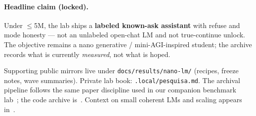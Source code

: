 \paragraph{Headline claim (locked).}
Under $\leq$5M, the lab ships a \textbf{labeled known-ask assistant} with refuse
and mode honesty --- not an unlabeled open-chat LM and not true-continue unlock.
The objective remains a nano generative / mini-AGI-inspired student; the archive
records what is currently \emph{measured}, not what is hoped.

Supporting public mirrors live under \texttt{docs/results/nano-lm/}
(recipes, freeze notes, wave summaries). Private lab book: \texttt{.local/pesquisa.md}.
The archival pipeline follows the same paper discipline used in our companion
benchmark lab~\cite{quantun_ia}; the code archive is~\cite{nano_lm_lab}.
Context on small coherent LMs and scaling appears in~\cite{tinystories,kaplan2020scaling}.
